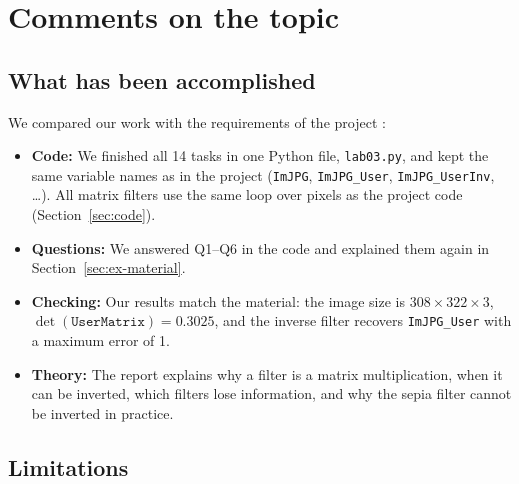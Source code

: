 
\section{Comments on the topic}\label{sec:comments}

\subsection{What has been accomplished}

We compared our work with the requirements of the project \cite{zemlyanova2020}:
\begin{itemize}
  \item \textbf{Code:} We finished all 14 tasks in one Python file,
    \texttt{lab03.py}, and kept the same variable names as in the project
    (\texttt{ImJPG}, \texttt{ImJPG\_User}, \texttt{ImJPG\_UserInv}, \dots).
    All matrix filters use the same loop over pixels as the project code
    (Section~\ref{sec:code}).
  \item \textbf{Questions:} We answered Q1--Q6 in the code and explained them
    again in Section~\ref{sec:ex-material}.
  \item \textbf{Checking:} Our results match the material: the image size is
    $308 \times 322 \times 3$, $\det(\texttt{UserMatrix}) = 0.3025$, and the
    inverse filter recovers \texttt{ImJPG\_User} with a maximum error of 1.
  \item \textbf{Theory:} The report explains why a filter is a matrix
    multiplication, when it can be inverted, which filters lose information, and
    why the sepia filter cannot be inverted in practice.
\end{itemize}

\subsection{Limitations}

